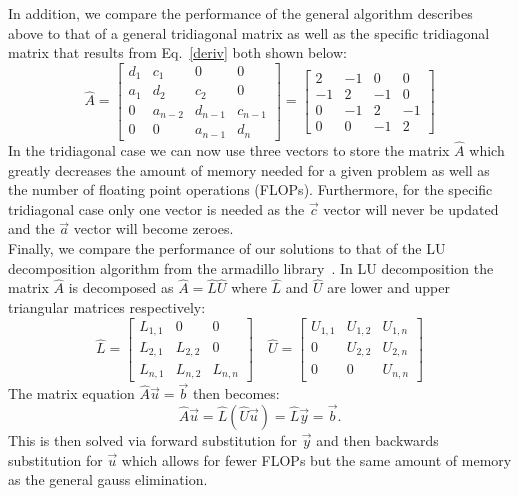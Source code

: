 \documentclass[prc,amsmath,twocolumn,superscriptaddress]{revtex4}
\begin{document}
In addition, we compare the performance of the general algorithm describes above to that of a general tridiagonal matrix as well as the specific tridiagonal matrix that results from Eq.~\ref{deriv} both shown below:
\begin{equation}
\hat{A}=\begin{bmatrix} d_{1} & c_{1} &0&0\\ a_{1}  & d_{2} &c_{2}&0 \\ 0  & a_{n-2}  &d_{n-1}&c_{n-1} \\ 0  &0& a_{n-1}  &d_{n} \end{bmatrix}=
\begin{bmatrix} 2 & -1&0&0\\ -1  & 2 &-1&0 \\ 0  & -1  &2&-1 \\ 0  &0& -1  &2 \end{bmatrix}
\end{equation}
\indent In the tridiagonal case we can now use three vectors to store the matrix $\hat{A}$ which greatly decreases the amount of memory needed for a given problem as well as the number of floating point operations (FLOPs). Furthermore, for the specific tridiagonal case only one vector is needed as the $\vec{c}$ vector will never be updated and the $\vec{a}$ vector will become zeroes. \\

Finally, we compare the performance of our solutions to that of the LU decomposition algorithm from the armadillo library~\cite{armadillo}. In LU decomposition the matrix $\hat{A}$ is decomposed as $\hat{A}=\hat{L}\hat{U}$ where $\hat{L}$ and $\hat{U}$ are lower and upper triangular matrices respectively:
\begin{equation}
\hat{L}=\begin{bmatrix} L_{1,1} & 0&0 \\ L_{2,1}  & L_{2,2} &0 \\ L_{n,1}  & L_{n,2}  &L_{n,n}\end{bmatrix} \quad
\hat{U}=\begin{bmatrix} U_{1,1} & U_{1,2}& U_{1,n}\\ 0  & U_{2,2} &U_{2,n} \\ 0  & 0  &U_{n,n}\end{bmatrix} 
\end{equation}
The matrix equation $\hat{A}\vec{u}=\vec{b}$ then becomes:
\begin{equation}
\hat{A}\vec{u}=\hat{L}(\hat{U}\vec{u})=\hat{L}\vec{y}=\vec{b}.
\end{equation}
This is then solved via forward substitution for $\vec{y}$ and then backwards substitution for $\vec{u}$ which allows for fewer FLOPs but the same amount of memory as the general gauss elimination.
\end{document}
